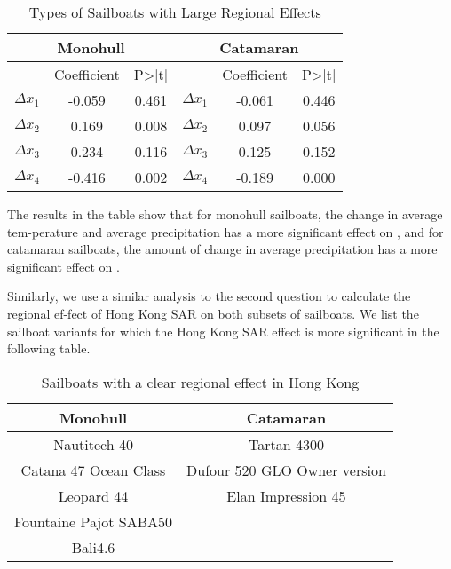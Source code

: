 \vspace{-0.5cm}
\begin{table}[H]
    \begin{center}
    \caption{ Types of Sailboats with Large Regional Effects}
    \resizebox{\textwidth}{!}
    {\begin{tabular}{c c c c c c}
    \toprule[2pt]
    \multicolumn{3}{m{8cm}}{\centering \textbf{Monohull}}
    &\multicolumn{3}{m{8cm}}{\centering \textbf{Catamaran}}\\
    \midrule
      & Coefficient & P>|t| &  & Coefficient & P>|t|\\
    \midrule
    $\Delta x_1$ & -0.059 & 0.461 & $\Delta x_1$ & -0.061 & 0.446\\
    $\Delta x_2$ & 0.169  & 0.008 & $\Delta x_2$ & 0.097  & 0.056 \\
    $\Delta x_3$ & 0.234  & 0.116 & $\Delta x_3$ & 0.125  & 0.152\\
    $\Delta x_4$ & -0.416 & 0.002 & $\Delta x_4$ & -0.189 & 0.000\\
    \bottomrule[2pt]
    \end{tabular}}
    \end{center}
\end{table}
\vspace{-0.5cm}

The results in the table show that for monohull sailboats, the change in average tem-perature and average precipitation has a more significant effect on  , and for catamaran sailboats, the amount of change in average precipitation has a more significant effect on  .

Similarly, we use a similar analysis to the second question to calculate the regional ef-fect of Hong Kong SAR on both subsets of sailboats. We list the sailboat variants for which the Hong Kong SAR effect is more significant in the following table.

\vspace{-0.5cm}
\begin{table}[H]
    \begin{center}
    \caption{Sailboats with a clear regional effect in Hong Kong}
    \resizebox{\textwidth}{!}
    {\begin{tabular}{c c}
    \toprule[2pt]
    \multicolumn{1}{m{8cm}}{\centering \textbf{Monohull}}
    &\multicolumn{1}{m{8cm}}{\centering \textbf{Catamaran}}\\
    \midrule
    Nautitech 40 & Tartan 4300\\
    Catana 47 Ocean Class & Dufour 520 GLO Owner version\\
    Leopard 44 & Elan Impression 45 \\
    Fountaine Pajot SABA50 & \\
    Bali4.6 & \\
    \bottomrule[2pt]
    \end{tabular}}
    \end{center}
\end{table}
\vspace{-0.5cm}


